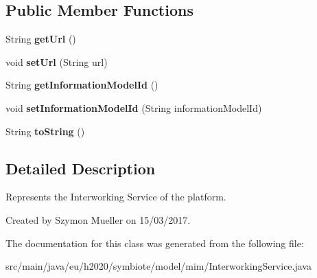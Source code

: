 \subsection*{Public Member Functions}
\begin{DoxyCompactItemize}
\item 
\mbox{\label{classeu_1_1h2020_1_1symbiote_1_1model_1_1mim_1_1InterworkingService_a6341996ef9b4628248741005e4792cf6}} 
String {\bfseries get\+Url} ()
\item 
\mbox{\label{classeu_1_1h2020_1_1symbiote_1_1model_1_1mim_1_1InterworkingService_a5ef2a1ec5779ddc9c79b67a84f930ab1}} 
void {\bfseries set\+Url} (String url)
\item 
\mbox{\label{classeu_1_1h2020_1_1symbiote_1_1model_1_1mim_1_1InterworkingService_a0342322cdfd4f7a8ebb5743e2785ff13}} 
String {\bfseries get\+Information\+Model\+Id} ()
\item 
\mbox{\label{classeu_1_1h2020_1_1symbiote_1_1model_1_1mim_1_1InterworkingService_a06e49f8d47f4ca28396c7b8fb9b005a2}} 
void {\bfseries set\+Information\+Model\+Id} (String information\+Model\+Id)
\item 
\mbox{\label{classeu_1_1h2020_1_1symbiote_1_1model_1_1mim_1_1InterworkingService_a9603724fe0714d9d97b0a7c3eb889212}} 
String {\bfseries to\+String} ()
\end{DoxyCompactItemize}


\subsection{Detailed Description}
Represents the Interworking Service of the platform.

Created by Szymon Mueller on 15/03/2017. 

The documentation for this class was generated from the following file\+:\begin{DoxyCompactItemize}
\item 
src/main/java/eu/h2020/symbiote/model/mim/Interworking\+Service.\+java\end{DoxyCompactItemize}
